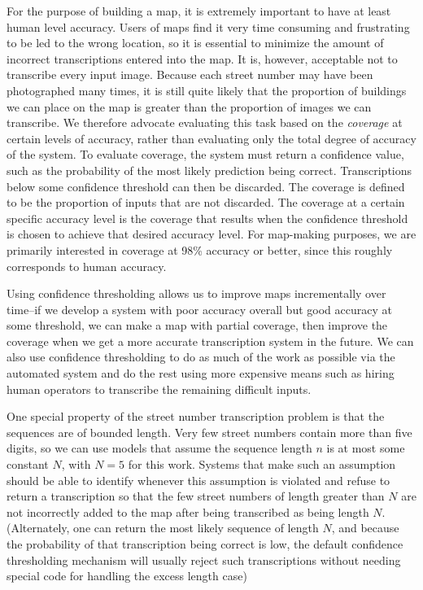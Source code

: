 \documentclass{article} \usepackage{comment}
\begin{document}
For the purpose of building a map, it is extremely important to have at least human level accuracy.
Users of maps find it very time consuming and frustrating to be led to the wrong location, so it is
essential to minimize the amount of incorrect transcriptions entered into the map. It is, however,
acceptable not to transcribe every input image. Because each street number may have been photographed many
times, it is still quite likely that the proportion of buildings we can place on the map is greater than
the proportion of images we can transcribe. We therefore advocate evaluating this task based on the
{\em coverage} at certain levels of accuracy, rather than evaluating only the total degree of accuracy
of the system. To evaluate coverage, the system must return a confidence value, such as the probability
of the most likely prediction being correct. Transcriptions below some confidence threshold can then
be discarded. The coverage is defined to be the proportion of inputs that are not discarded. The
coverage at a certain specific accuracy level is the coverage that results when the confidence threshold
is chosen to achieve that desired accuracy level. For map-making purposes, we are primarily interested
in coverage at 98\% accuracy or better, since this roughly corresponds to human accuracy.

Using confidence thresholding allows us to improve maps incrementally over time--if we develop a system
with poor accuracy overall but good accuracy at some threshold, we can make a map with partial coverage,
then improve the coverage when we get a more accurate transcription system in the future. We can also
use confidence thresholding to do as much of the work as possible via the automated system and do the
rest using more expensive means such as hiring human operators to transcribe the remaining difficult inputs.

One special property of the street number transcription problem is that the sequences are of bounded
length. Very few street numbers contain more than five digits, so we can use models that assume the
sequence length $n$ is at most some constant $N$, with $N=5$ for this work. Systems that make such
an assumption should be able to identify whenever this assumption is violated and refuse to return a
transcription so that the few street numbers of length greater than $N$ are not incorrectly added to
the map after being transcribed as being length $N$. (Alternately, one can return the most likely
sequence of length $N$, and because the probability of that transcription being correct is low, the
default confidence thresholding mechanism will usually reject such transcriptions without needing
special code for handling the excess length case)
\end{document}
